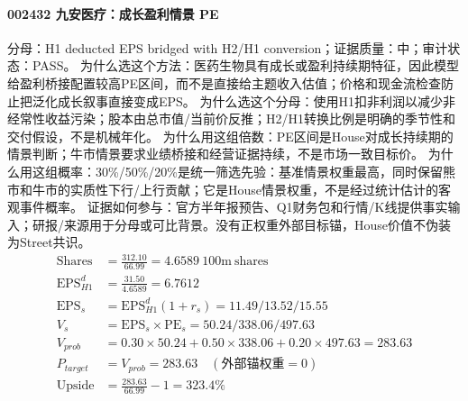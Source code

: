 \paragraph{002432 九安医疗：成长盈利情景 PE}
分母：H1 deducted EPS bridged with H2/H1 conversion；证据质量：中；审计状态：PASS。
为什么选这个方法：医药生物具有成长或盈利持续期特征，因此模型给盈利桥接配置较高PE区间，而不是直接给主题收入估值；价格和现金流检查防止把泛化成长叙事直接变成EPS。
为什么选这个分母：使用H1扣非利润以减少非经常性收益污染；股本由总市值/当前价反推；H2/H1转换比例是明确的季节性和交付假设，不是机械年化。
为什么用这组倍数：PE区间是House对成长持续期的情景判断；牛市情景要求业绩桥接和经营证据持续，不是市场一致目标价。
为什么用这组概率：30\%/50\%/20\%是统一筛选先验：基准情景权重最高，同时保留熊市和牛市的实质性下行/上行贡献；它是House情景权重，不是经过统计估计的客观事件概率。
证据如何参与：官方半年报预告、Q1财务包和行情/K线提供事实输入；研报/来源用于分母或可比背景。没有正权重外部目标锚，House价值不伪装为Street共识。
\begin{align*}
\mathrm{Shares} &= \frac{312.10}{66.99}=4.6589\ \mathrm{100m\ shares}\\
\mathrm{EPS}_{H1}^d &= \frac{31.50}{4.6589}=6.7612\\
\mathrm{EPS}_s &= \mathrm{EPS}_{H1}^d(1+r_s)=11.49/13.52/15.55\\
V_s &= \mathrm{EPS}_s\times \mathrm{PE}_s=50.24/338.06/497.63\\
V_{prob} &= 0.30\times 50.24+0.50\times 338.06+0.20\times 497.63=283.63\\
P_{target} &= V_{prob}=283.63\quad(\text{外部锚权重}=0)\\
\mathrm{Upside} &= \frac{283.63}{66.99}-1=323.4\%\\
\end{align*}

